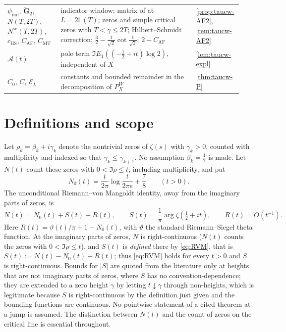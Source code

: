 \documentclass[11pt,a4paper]{article}
\numberwithin{equation}{section}
\theoremstyle{definition}
\theoremstyle{remark}
\begin{document}
\begin{longtable}{@{}p{0.22\linewidth}p{0.56\linewidth}p{0.16\linewidth}@{}}
$\psi_{\mathrm{ind}}$, $\widetilde{\mathbf G}_2$, $N(T,2T)$, $N^{\mathrm{sc}}(T,2T)$, $c_{\mathrm{HS}}$, $C_{\mathrm{AF}}$, $C_{\mathrm{MT}}$ & indicator window; matrix of \cite{AlpogeFurman2026} at $L=2\mathsf L(T)$; zeros and simple critical zeros with $T<\gamma\le2T$; Hilbert--Schmidt correction; $\frac32-\frac1{\sqrt2}\cot\frac1{\sqrt2}$; $2-C_{\mathrm{AF}}$ & \cref{prop:taucw-AF2}, \cref{rem:taucw-AF2}\\
$\mathscr A(t)$ & pole term $\Im E_1((-\frac12+it)\log2)$, independent of $X$ & \cref{lem:taucw-expl}\\
$C_0$, $C$, $\mathcal E_L$ & constants and bounded remainder in the decomposition of $P^W_X$ & \cref{thm:taucw-P}\\
\bottomrule
\end{longtable}
\endgroup

\section{Definitions and scope}\label{sec:definitions}
Let $\rho_k=\beta_k+i\gamma_k$ denote the nontrivial zeros of $\zeta(s)$ with $\gamma_k>0$, counted with multiplicity and indexed so that $\gamma_k\le\gamma_{k+1}$. No assumption $\beta_k=\tfrac12$ is made. Let $N(t)$ count these zeros with $0<\Im\rho\le t$, including multiplicity, and put
\begin{equation}\label{eq:N0}
N_0(t)=\frac{t}{2\pi}\log\frac{t}{2\pi e}+\frac78\qquad(t>0).
\end{equation}
The unconditional Riemann--von Mangoldt identity, away from the imaginary parts of zeros, is
\begin{equation}\label{eq:RVM}
N(t)=N_0(t)+S(t)+R(t),\qquad
S(t)=\frac1\pi\arg\zeta(\tfrac12+it),\qquad R(t)=O(t^{-1}).
\end{equation}
Here $R(t)=\vartheta(t)/\pi+1-N_0(t)$, with $\vartheta$ the standard Riemann--Siegel theta function. At the imaginary parts of zeros, $N$ is right-continuous ($N(t)$ counts the zeros with $0<\Im\rho\le t$), and $S(t)$ is \emph{defined} there by \eqref{eq:RVM}, that is $S(t):=N(t)-N_0(t)-R(t)$; thus \eqref{eq:RVM} holds for every $t>0$ and $S$ is right-continuous. Bounds for $|S|$ are quoted from the literature only at heights that are not imaginary parts of zeros, where $S$ has no convention-dependence; they are extended to a zero height $\gamma$ by letting $t\downarrow\gamma$ through non-heights, which is legitimate because $S$ is right-continuous by the definition just given and the bounding functions are continuous. No pointwise statement of a cited theorem at a jump is assumed. The distinction between $N(t)$ and the count of zeros on the critical line is essential throughout.
\end{document}
